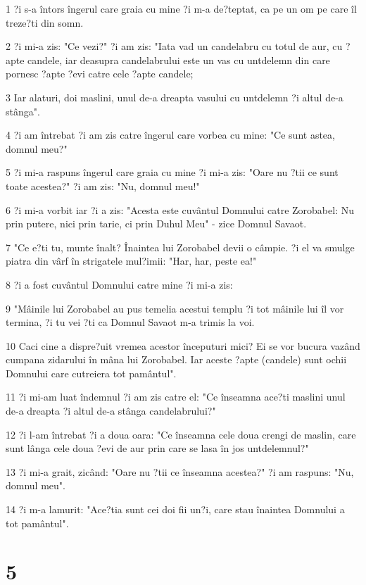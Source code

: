 \par 1 ?i s-a întors îngerul care graia cu mine ?i m-a de?teptat, ca pe un om pe care îl treze?ti din somn.
\par 2 ?i mi-a zis: "Ce vezi?" ?i am zis: "Iata vad un candelabru cu totul de aur, cu ?apte candele, iar deasupra candelabrului este un vas cu untdelemn din care pornesc ?apte ?evi catre cele ?apte candele;
\par 3 Iar alaturi, doi maslini, unul de-a dreapta vasului cu untdelemn ?i altul de-a stânga".
\par 4 ?i am întrebat ?i am zis catre îngerul care vorbea cu mine: "Ce sunt astea, domnul meu?"
\par 5 ?i mi-a raspuns îngerul care graia cu mine ?i mi-a zis: "Oare nu ?tii ce sunt toate acestea?" ?i am zis: "Nu, domnul meu!"
\par 6 ?i mi-a vorbit iar ?i a zis: "Acesta este cuvântul Domnului catre Zorobabel: Nu prin putere, nici prin tarie, ci prin Duhul Meu" - zice Domnul Savaot.
\par 7 "Ce e?ti tu, munte înalt? Înaintea lui Zorobabel devii o câmpie. ?i el va smulge piatra din vârf în strigatele mul?imii: "Har, har, peste ea!"
\par 8 ?i a fost cuvântul Domnului catre mine ?i mi-a zis:
\par 9 "Mâinile lui Zorobabel au pus temelia acestui templu ?i tot mâinile lui îl vor termina, ?i tu vei ?ti ca Domnul Savaot m-a trimis la voi.
\par 10 Caci cine a dispre?uit vremea acestor începuturi mici? Ei se vor bucura vazând cumpana zidarului în mâna lui Zorobabel. Iar aceste ?apte (candele) sunt ochii Domnului care cutreiera tot pamântul".
\par 11 ?i mi-am luat îndemnul ?i am zis catre el: "Ce înseamna ace?ti maslini unul de-a dreapta ?i altul de-a stânga candelabrului?"
\par 12 ?i l-am întrebat ?i a doua oara: "Ce înseamna cele doua crengi de maslin, care sunt lânga cele doua ?evi de aur prin care se lasa în jos untdelemnul?"
\par 13 ?i mi-a grait, zicând: "Oare nu ?tii ce înseamna acestea?" ?i am raspuns: "Nu, domnul meu".
\par 14 ?i m-a lamurit: "Ace?tia sunt cei doi fii un?i, care stau înaintea Domnului a tot pamântul".

\chapter{5}

